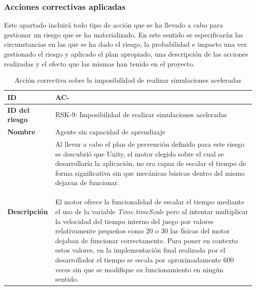 \subsubsection{Acciones correctivas aplicadas}
\label{AC}
Este apartado incluirá todo tipo de acción que se ha llevado a cabo para gestionar un riesgo que se ha materializado. En este sentido se especificarán las circunstancias en las que se ha dado el riesgo, la probabilidad e impacto una vez gestionado el riesgo y aplicado el plan apropiado, una descripción de las acciones realizadas y el efecto que las mismas han tenido en el proyecto.


\setcounter{contador_accion_correctiva}{1}

\begin{center}
	\begin{longtable}{ | p{5.6cm} | p{8.5cm} | } 
		
		\caption{Acción correctiva sobre la imposibilidad de realizar simulaciones aceleradas}\\
		
		\hline
		\textbf{ID} & AC-\arabic{contador_accion_correctiva}\label{tab:tabla_riesgo_escalado}
		{contador_accion_correctiva} \\
		
		
		\hline 
		\textbf{ID del riesgo} & RSK-9: Imposibilidad de realizar simulaciones aceleradas \\
		
		\hline 
		\textbf{Nombre} &
		Agente sin capacidad de aprendizaje\\ 
		
		\hline
		\textbf{Descripción} &
		\pbox{8.4cm}{ 
			Al llevar a cabo el plan de prevención definido para este riesgo se descubrió que Unity, el motor elegido sobre el cual se desarrollaría la aplicación, no era capaz de escalar el tiempo de forma significativa sin que mecánicas básicas dentro del mismo dejaran de funcionar.\\\\El motor ofrece la funcionalidad de escalar el tiempo mediante el uso de la variable \textit{Time.timeScale} pero al intentar multiplicar la velocidad del tiempo interno del juego por valores relativamente pequeños como 20 o 30 las físicas del motor dejaban de funcionar correctamente. Para poner en contexto estos valores, en la implementación final realizada por el desarrollador el tiempo se escala por aproximadamente 600 veces sin que se modifique su funcionamiento en ningún sentido.
		}
		\\
		

\end{longtable}
\end{center}
